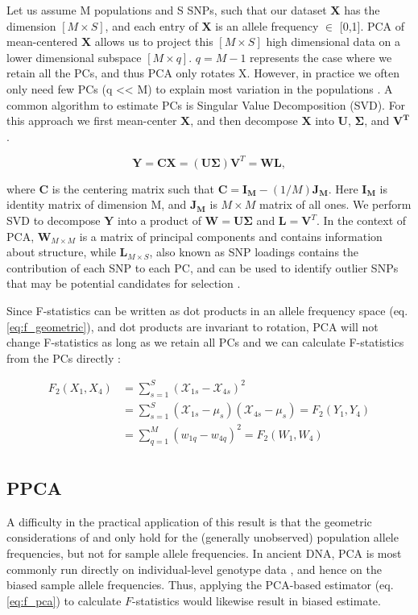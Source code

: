 \documentclass[12pt, letterpaper]{article}
\newcommand{\MX}{\mathbf{X}}
\begin{document}
Let us assume M populations and S SNPs, such that our dataset $\mathbf{X}$ has the dimension $[M \times S]$, and each entry of $\mathbf{X}$ is an allele frequency $\in$ [0,1]. PCA of mean-centered $\MX$ allows us to project this $[M \times S]$ high dimensional data on a lower dimensional subspace $[M \times q]$. $q = M-1$ represents the case where we retain all the PCs, and thus PCA only rotates X. However, in practice we often only need few PCs (q << M) to explain most variation in the populations \cite{peter_geometric_2022}. A common algorithm to estimate PCs is Singular Value Decomposition (SVD). For this approach we first mean-center $\mathbf{X}$, and then decompose $\mathbf{X}$ into $\mathbf{U}$, $\mathbf{\Sigma}$, and $\mathbf{V^T}$.

$$\mathbf{Y} = \mathbf{C}\mathbf{X} = (\mathbf{U}\mathbf{\Sigma}) \mathbf{V}^T = \mathbf{WL},$$

where $\mathbf{C}$ is the centering matrix such that $\mathbf{C} = \mathbf{I_M} - (1/M)\mathbf{J_M}$. Here $\mathbf{I_M}$ is identity matrix of dimension M, and $\mathbf{J_M}$ is $M\times M$ matrix of all ones. We perform SVD to decompose $\mathbf{Y}$ into a product of $\mathbf{W} = \mathbf{U\Sigma}$ and $\mathbf{L} = \mathbf{V}^T$. In the context of PCA, $\mathbf{W}_{M\times M}$ is a matrix of principal components and contains information about structure, while $\mathbf{L}_{M\times S}$, also known as SNP loadings contains the contribution of each SNP to each PC, and can be used to identify outlier SNPs that may be potential candidates for selection \cite{gower_distance_1966}. 

Since F-statistics can be written as dot products in an allele frequency space (eq. \ref{eq:f_geometric}), and dot products are invariant to rotation, PCA will not change F-statistics as long as we retain all PCs and we can calculate F-statistics from the PCs directly \cite{peter_geometric_2022}:

\begin{align}\label{eq:f_pca}
F_2(X_1,X_4) &= \sum_{s=1}^S(\mathcal{X}_{1s} - \mathcal{X}_{4s})^2\nonumber\\
&= \sum_{s=1}^S(\mathcal{X}_{1s} - \mu_s)(\mathcal{X}_{4s} - \mu_s) = F_2(Y_1,Y_4)\nonumber\\
&= \sum_{q=1}^M(w_{1q} - w_{4q})^2 = F_2(W_1,W_4)\nonumber\\
\end{align}



\subsection{PPCA}\label{theory-ppca}
A difficulty in the practical application of this result is that the geometric considerations of \cite{oteo-garcia_geometrical_2021} and \cite{peter_geometric_2022} only hold for the (generally unobserved) population allele frequencies, but not for sample allele frequencies. In ancient DNA, PCA is most commonly run directly on individual-level genotype data \cite{patterson_population_2006}, and hence on the biased sample allele frequencies. Thus, applying the PCA-based estimator (eq. \ref{eq:f_pca}) to calculate $F$-statistics would likewise result in biased estimate.
\end{document}
